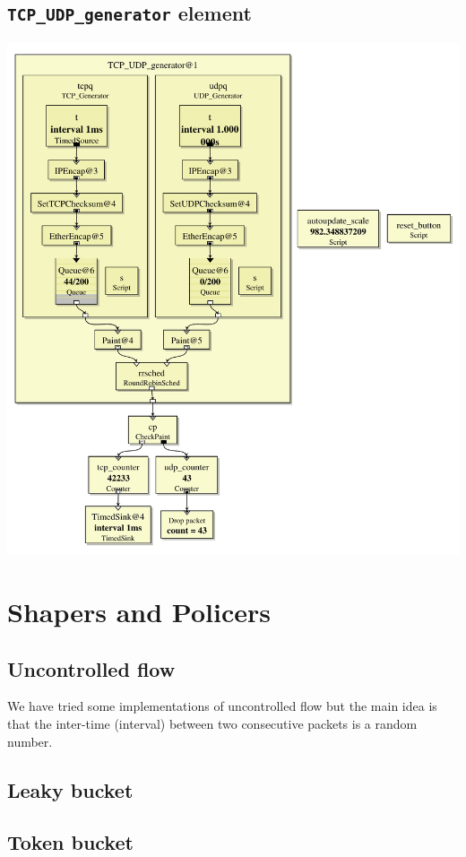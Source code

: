 \documentclass[a4paper]{article}
\begin{document}
  \subsection{\texttt{TCP\_UDP\_generator} element}
    \begin{center}
	  \includegraphics[scale=0.55]{TCP_UDP_generator.pdf}
	  \label{fig:tcpudp}
  \end{center}
  \section{Shapers and Policers}
  \subsection{Uncontrolled flow}
  We have tried some implementations of uncontrolled flow but the main idea is
  that the inter-time (interval) between two consecutive packets is a random
  number.
  \subsection{Leaky bucket}
  \subsection{Token bucket}
\end{document}
